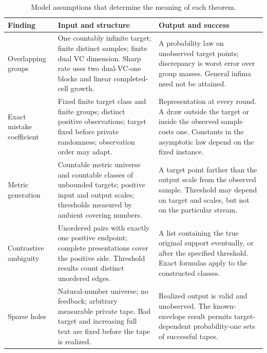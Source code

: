 \begin{table}[H]
\centering\small
\caption{Model assumptions that determine the meaning of each theorem.}\label{tab:contracts}
\begin{tabularx}{\textwidth}{@{}p{}Y Y@{}}
\toprule
\textbf{Finding} & \textbf{Input and structure} & \textbf{Output and success}\\
\midrule
Overlapping groups & One countably infinite target; finite distinct samples; finite dual VC dimension. Sharp rate uses two dual-VC-one blocks and linear completed-cell growth. & A probability law on unobserved target points; discrepancy is worst error over group masses. General infima need not be attained.\\
\addlinespace
Exact mistake coefficient & Fixed finite target class and finite groups; distinct positive observations; target fixed before private randomness; observation order may adapt. & Representation at every round. A draw outside the target or inside the observed sample costs one. Constants in the asymptotic law depend on the fixed instance.\\
\addlinespace
Metric generation & Countable metric universe and countable classes of unbounded targets; positive input and output scales; thresholds measured by ambient covering numbers. & A target point farther than the output scale from the observed sample. Threshold may depend on target and scales, but not on the particular stream.\\
\addlinespace
Contrastive ambiguity & Unordered pairs with exactly one positive endpoint; complete presentations cover the positive side. Threshold results count distinct unordered edges. & A list containing the true original support eventually, or after the specified threshold. Exact formulas apply to the constructed classes.\\
\addlinespace
Sparse holes & Natural-number universe; no feedback; arbitrary measurable private tape. Bad target and increasing full text are fixed before the tape is realized. & Realized output is valid and unobserved. The known-envelope result permits target-dependent probability-one sets of successful tapes.\\
\bottomrule
\end{tabularx}
\end{table}
\vspace{6pt}
